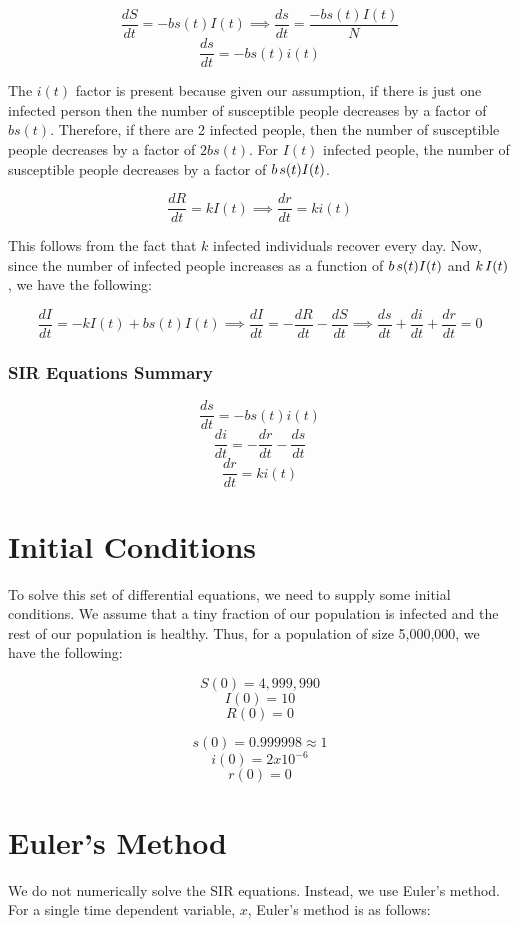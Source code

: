 \documentclass{article}
\begin{document}
\[\frac{dS}{dt} = -b s(t) I(t) \implies \frac{ds}{dt} = \frac{-b s(t) I(t)}{N}\]
\[\frac{ds}{dt} = -b s(t) i(t)\]

\noindent
The $i(t)$ factor is present because given our assumption, if there is just one infected person then the number of susceptible people decreases by a factor of $b s(t)$. Therefore, if there are 2 infected people, then the number of susceptible people decreases by a factor of $2b s(t)$. For $I(t)$ infected people, the number of susceptible people decreases by a factor of $b \hspace{0.5mm} s(t) I(t)$. 

\[\frac{dR}{dt} = k I(t) \implies \frac{dr}{dt} = k i(t)\]

\noindent
This follows from the fact that $k$ infected individuals recover every day. Now, since the number of infected people increases as a function of $b \hspace{0.5mm} s(t) I(t)$ and $k \hspace{0.5mm} I(t)$, we have the following:

\[\frac{dI}{dt} = -k I(t) + b s(t) I(t) \implies \frac{dI}{dt} = -\frac{dR}{dt} - \frac{dS}{dt} \implies \frac{ds}{dt} + \frac{di}{dt} + \frac{dr}{dt} = 0\]

\subsubsection*{SIR Equations Summary}
\[\frac{ds}{dt} = -b s(t) i(t)\]
\[\frac{di}{dt} = - \frac{dr}{dt} - \frac{ds}{dt}\]
\[\frac{dr}{dt} = k i(t)\]

\section{Initial Conditions}
To solve this set of differential equations, we need to supply some initial conditions. We assume that a tiny fraction of our population is infected and the rest of our population is healthy. Thus, for a population of size 5,000,000, we have the following:

\[S(0) = 4,999,990\]
\[I(0) = 10\]
\[R(0) = 0\]

\[s(0) = 0.999998 \approx 1\]
\[i(0) = 2 x 10^{-6}\]
\[r(0) = 0\]

\section{Euler's Method}
We do not numerically solve the SIR equations. Instead, we use Euler's method. For a single time dependent variable, $x$, Euler's method is as follows:
\end{document}
